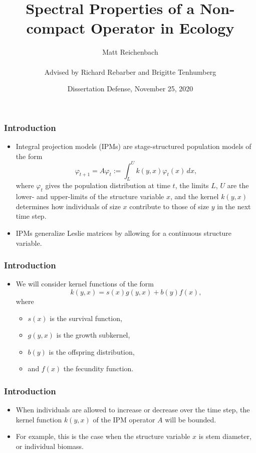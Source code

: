 \documentclass{beamer}
\title[Dissertation Defense]{Spectral Properties of a Non-compact Operator in Ecology}
\author[Matt Reichenbach]{Matt Reichenbach \\ \, \\ Advised by Richard Rebarber and Brigitte Tenhumberg}
\date[November 25, 2020]{Dissertation Defense, November 25, 2020}
\begin{document}
\frame{\titlepage}


\begin{frame}
\frametitle{Introduction}
	\begin{itemize}
		\item Integral projection models (IPMs) are stage-structured population models of the form
		\[\varphi_{t+1} = A \varphi_t := \int_L^U k(y, x) \varphi_t(x) \, dx,\]
		\pause
		where $\varphi_t$ gives the population distribution at time $t$, the limits $L$, $U$ are the lower- and upper-limits of the structure variable $x$, and the kernel $k(y, x)$ determines how individuals of size $x$ contribute to those of size $y$ in the next time step.
		\pause
		\item IPMs generalize Leslie matrices by allowing for a continuous structure variable.
	\end{itemize}
\end{frame}

\begin{frame}
	\frametitle{Introduction}
	\begin{itemize}
		\item We will consider kernel functions of the form
		\[k(y, x) = s(x) g(y, x) + b(y)f(x),\]
		\pause
		where 
		\pause
		\begin{itemize}
			\item $s(x)$ is the survival function,
			\pause
			\item $g(y, x)$ is the growth subkernel,
			\pause
			\item $b(y)$ is the offspring distribution, 
			\pause
			\item and $f(x)$ the fecundity function.	
		\end{itemize}
	\end{itemize}
\end{frame}

\begin{frame}
	\frametitle{Introduction}
	\begin{itemize}
		\item When individuals are allowed to increase or decrease over the time step, the kernel function $k(y, x)$ of the IPM operator $A$ will be bounded.
		\pause
		\item For example, this is the case when the structure variable $x$ is stem diameter, or individual biomass.
		\pause
	\end{itemize}
\end{frame}
\end{document}
